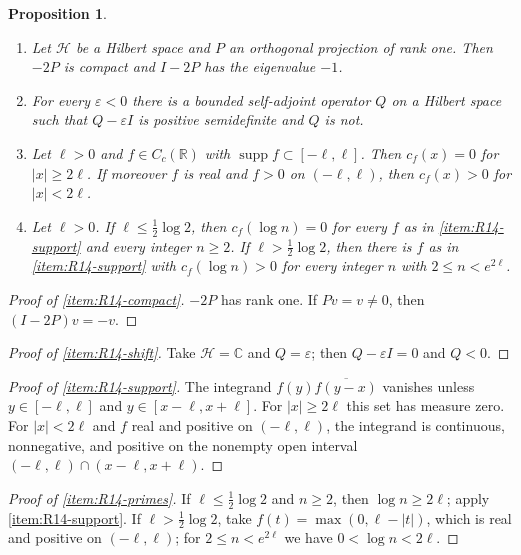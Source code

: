 \documentclass[11pt]{amsart}
\theoremstyle{plain}
\newtheorem{proposition}[theorem]{Proposition}
\theoremstyle{definition}
\theoremstyle{remark}
\numberwithin{equation}{section}
\newcommand{\C}{\mathbb{C}}
\newcommand{\R}{\mathbb{R}}
\newcommand{\cH}{\mathscr{H}}
\begin{document}
\begin{proposition}\label{prop:R14}
\leavevmode
\begin{enumerate}[label=(\roman*)]
\item\label{item:R14-compact} Let $\cH$ be a Hilbert space and $P$ an
  orthogonal projection of rank one. Then $-2P$ is compact and $I-2P$
  has the eigenvalue $-1$.
\item\label{item:R14-shift} For every $\varepsilon<0$ there is a bounded
  self-adjoint operator $Q$ on a Hilbert space such that
  $Q-\varepsilon I$ is positive semidefinite and $Q$ is not.
\item\label{item:R14-support} Let $\ell>0$ and $f\in C_c(\R)$ with
  $\operatorname{supp}f\subset[-\ell,\ell]$. Then $c_f(x)=0$ for
  $|x|\ge2\ell$. If moreover $f$ is real and $f>0$ on $(-\ell,\ell)$,
  then $c_f(x)>0$ for $|x|<2\ell$.
\item\label{item:R14-primes} Let $\ell>0$. If
  $\ell\le\tfrac12\log2$, then $c_f(\log n)=0$ for every $f$ as in
  \ref{item:R14-support} and every integer $n\ge2$. If
  $\ell>\tfrac12\log2$, then there is $f$ as in \ref{item:R14-support}
  with $c_f(\log n)>0$ for every integer $n$ with $2\le n<e^{2\ell}$.
\end{enumerate}
\end{proposition}

\begin{proof}[Proof of \ref{item:R14-compact}]
$-2P$ has rank one. If $Pv=v\ne0$, then $(I-2P)v=-v$.
\end{proof}

\begin{proof}[Proof of \ref{item:R14-shift}]
Take $\cH=\C$ and $Q=\varepsilon$; then $Q-\varepsilon I=0$ and $Q<0$.
\end{proof}

\begin{proof}[Proof of \ref{item:R14-support}]
The integrand $f(y)\overline{f(y-x)}$ vanishes unless $y\in[-\ell,\ell]$
and $y\in[x-\ell,x+\ell]$. For $|x|\ge2\ell$ this set has measure zero.
For $|x|<2\ell$ and $f$ real and positive on $(-\ell,\ell)$, the
integrand is continuous, nonnegative, and positive on the nonempty open
interval $(-\ell,\ell)\cap(x-\ell,x+\ell)$.
\end{proof}

\begin{proof}[Proof of \ref{item:R14-primes}]
If $\ell\le\tfrac12\log2$ and $n\ge2$, then $\log n\ge2\ell$; apply
\ref{item:R14-support}. If $\ell>\tfrac12\log2$, take $f(t)=\max(0,
\ell-|t|)$, which is real and positive on $(-\ell,\ell)$; for $2\le
n<e^{2\ell}$ we have $0<\log n<2\ell$.
\end{proof}
\end{document}
